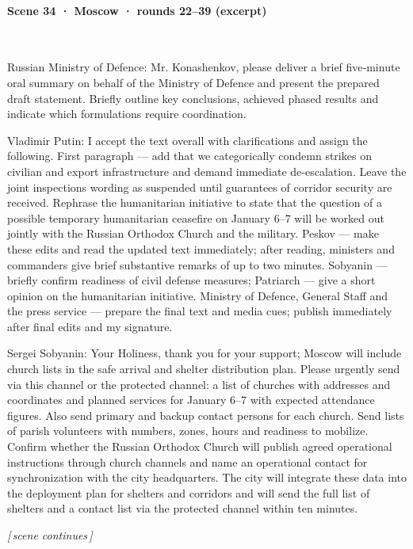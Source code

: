 \paragraph{Scene 34 · Moscow · rounds 22–39 (excerpt)}\mbox{}\\[2pt]
\begin{zhblock}\small\setlength{\parskip}{3pt}
Russian Ministry of Defence:
Mr. Konashenkov, please deliver a brief five‑minute oral summary on behalf of the Ministry of Defence and present the prepared draft statement.
Briefly outline key conclusions, achieved phased results and indicate which formulations require coordination.
\par Vladimir Putin:
I accept the text overall with clarifications and assign the following.
First paragraph — add that we categorically condemn strikes on civilian and export infrastructure and demand immediate de‑escalation.
Leave the joint inspections wording as suspended until guarantees of corridor security are received.
Rephrase the humanitarian initiative to state that the question of a possible temporary humanitarian ceasefire on January 6–7 will be worked out jointly with the Russian Orthodox Church and the military.
Peskov — make these edits and read the updated text immediately; after reading, ministers and commanders give brief substantive remarks of up to two minutes.
Sobyanin — briefly confirm readiness of civil defense measures; Patriarch — give a short opinion on the humanitarian initiative.
Ministry of Defence, General Staff and the press service — prepare the final text and media cues; publish immediately after final edits and my signature.
\par Sergei Sobyanin:
Your Holiness, thank you for your support; Moscow will include church lists in the safe arrival and shelter distribution plan.
Please urgently send via this channel or the protected channel: a list of churches with addresses and coordinates and planned services for January 6–7 with expected attendance figures.
Also send primary and backup contact persons for each church.
Send lists of parish volunteers with numbers, zones, hours and readiness to mobilize.
Confirm whether the Russian Orthodox Church will publish agreed operational instructions through church channels and name an operational contact for synchronization with the city headquarters.
The city will integrate these data into the deployment plan for shelters and corridors and will send the full list of shelters and a contact list via the protected channel within ten minutes.
\par\textit{[\,scene continues\,]}
\end{zhblock}

